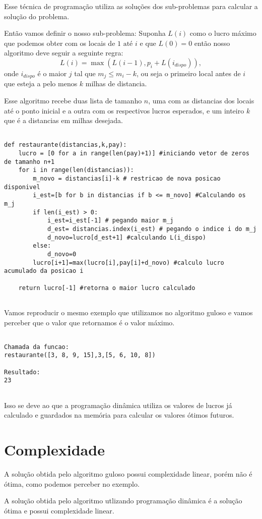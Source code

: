 \documentclass[11pt]{article}
\begin{document}
Esse técnica de programação utiliza as soluções dos sub-problemas para calcular a solução do problema.

Então vamos definir o nosso sub-problema: Suponha $L(i)$ como o lucro máximo que podemos obter com os locais de $1 \text{ até } i$ e que
$L(0)=0$ então nosso algoritmo deve seguir a seguinte regra: $$ L(i) = \max{(L(i-1),p_i + L(i_{dispo}))} ,$$  
onde $i_{dispo}$ é o maior $j$ tal que $m_j \leq m_i - k$, ou seja o primeiro local antes de $i$ que esteja a pelo menos $k$ milhas de distancia. 


Esse algoritmo recebe duas lista de tamanho $n$, uma com as distancias dos locais até o ponto inicial e a outra com os respectivos lucros esperados, e um inteiro $k$ que é a distancias em milhas desejada.

\begin{verbatim}

def restaurante(distancias,k,pay):
    lucro = [0 for a in range(len(pay)+1)] #iniciando vetor de zeros de tamanho n+1 
    for i in range(len(distancias)):
        m_novo = distancias[i]-k # restricao de nova posicao disponivel
        i_est=[b for b in distancias if b <= m_novo] #Calculando os m_j
        if len(i_est) > 0:
            i_est=i_est[-1] # pegando maior m_j
            d_est= distancias.index(i_est) # pegando o indice i do m_j
            d_novo=lucro[d_est+1] #calculando L(i_dispo)
        else:
            d_novo=0
        lucro[i+1]=max(lucro[i],pay[i]+d_novo) #calculo lucro acumulado da posicao i

    return lucro[-1] #retorna o maior lucro calculado


\end{verbatim}

Vamos reproducir o mesmo exemplo que utilizamos no algoritmo guloso e vamos perceber que o valor que retornamos é o valor máximo.

\begin{verbatim}

Chamada da funcao:
restaurante([3, 8, 9, 15],3,[5, 6, 10, 8])

Resultado:
23
 
\end{verbatim}

Isso se deve ao que a programação dinâmica utiliza os valores de lucros já calculado e guardados na memória para calcular os valores ótimos futuros. 




\section{Complexidade}
\label{sec-5}


A solução obtida pelo algoritmo guloso possui complexidade linear, porém não é ótima, como podemos perceber no exemplo.

A solução obtida pelo algoritmo utlizando programação dinâmica é a solução ótima e possui complexidade linear.
\end{document}
